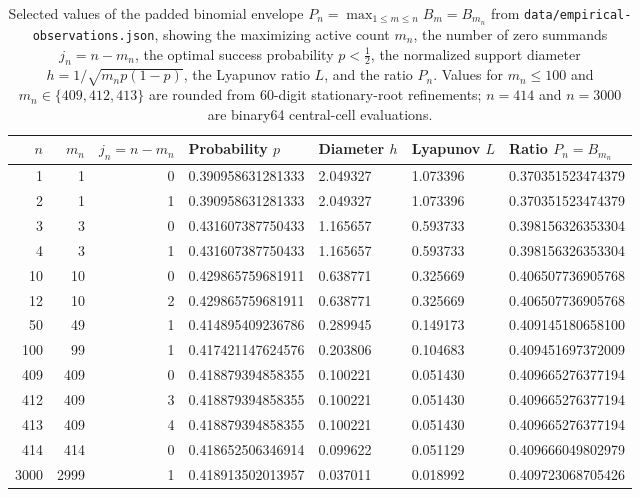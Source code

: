 \documentclass[11pt]{article}
\numberwithin{equation}{section}
\theoremstyle{definition}
\theoremstyle{remark}
\begin{document}
\begin{table}[t]
\centering
\caption{Selected values of the padded binomial envelope
$P_n=\max_{1\le m\le n}B_m=B_{m_n}$ from
\texttt{data/empirical-observations.json},
showing the maximizing active count $m_n$, the number of zero summands
$j_n=n-m_n$, the optimal success probability $p<\frac12$, the normalized
support diameter $h=1/\sqrt{m_n p(1-p)}$, the Lyapunov ratio $L$, and the
ratio $P_n$. Values for $m_n\le100$ and $m_n\in\{409,412,413\}$ are rounded
from 60-digit stationary-root refinements; $n=414$ and $n=3000$ are binary64
central-cell evaluations.}
\label{tab:binomial-optima}
\smallskip
\small
\begin{tabular}{@{}rrrllll@{}}
\toprule
$n$ & $m_n$ & $j_n=n-m_n$ & Probability $p$ & Diameter $h$ & Lyapunov $L$ & Ratio $P_n=B_{m_n}$ \\
\midrule
1    & 1    & 0 & 0.390958631281333 & 2.049327 & 1.073396 & 0.370351523474379 \\
2    & 1    & 1 & 0.390958631281333 & 2.049327 & 1.073396 & 0.370351523474379 \\
3    & 3    & 0 & 0.431607387750433 & 1.165657 & 0.593733 & 0.398156326353304 \\
4    & 3    & 1 & 0.431607387750433 & 1.165657 & 0.593733 & 0.398156326353304 \\
10   & 10   & 0 & 0.429865759681911 & 0.638771 & 0.325669 & 0.406507736905768 \\
12   & 10   & 2 & 0.429865759681911 & 0.638771 & 0.325669 & 0.406507736905768 \\
50   & 49   & 1 & 0.414895409236786 & 0.289945 & 0.149173 & 0.409145180658100 \\
100  & 99   & 1 & 0.417421147624576 & 0.203806 & 0.104683 & 0.409451697372009 \\
409  & 409  & 0 & 0.418879394858355 & 0.100221 & 0.051430 & 0.409665276377194 \\
412  & 409  & 3 & 0.418879394858355 & 0.100221 & 0.051430 & 0.409665276377194 \\
413  & 409  & 4 & 0.418879394858355 & 0.100221 & 0.051430 & 0.409665276377194 \\
414  & 414  & 0 & 0.418652506346914 & 0.099622 & 0.051129 & 0.409666049802979 \\
3000 & 2999 & 1 & 0.418913502013957 & 0.037011 & 0.018992 & 0.409723068705426 \\
\bottomrule
\end{tabular}
\end{table}
\end{document}
